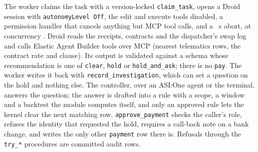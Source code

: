 \documentclass[conference]{IEEEtran}
\newcommand{\code}[1]{\texttt{#1}}
\begin{document}
The worker claims the task with a version-locked \code{claim\_task}, opens a Droid session with \code{autonomyLevel Off}, the edit and execute tools disabled, a permission handler that cancels anything but MCP tool calls, and a \droidTimeoutSec~s abort, at concurrency \workerConcurrency. Droid reads the receipts, contracts and the dispatcher's swap log and calls Elastic Agent Builder tools over MCP (nearest telematics rows, the contract rate and clause). Its output is validated against a schema whose recommendation is one of \code{clear}, \code{hold} or \code{hold\_and\_ask}; there is no \code{pay}. The worker writes it back with \code{record\_investigation}, which can set a question on the hold and nothing else. The controller, over an ASI:One agent or the terminal, answers the question; the answer is drafted into a rule with a scope, a window and a backtest the module computes itself, and only an approved rule lets the kernel clear the next matching row. \code{approve\_payment} checks the caller's role, refuses the identity that requested the hold, requires a call-back note on a bank change, and writes the only other \code{payment} row there is. Refusals through the \code{try\_*} procedures are committed audit rows.
\end{document}
